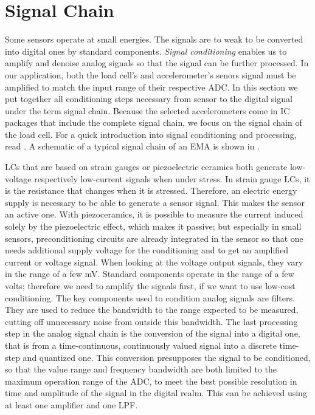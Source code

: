 \chapter{Signal Chain%
  \label{chap:\currfilebase}}

  Some sensors operate at small energies. The signals are to weak to be converted into digital ones by standard components. \emph{Signal conditioning} enables us to amplify and denoise analog signals so that the signal can be further processed. In our application, both the load cell's and accelerometer's senors signal must be amplified to match the input range of their respective \ac{ADC}. In this section we put together all conditioning steps necessary from sensor to the digital signal under the term signal chain. Because the selected accelerometers come in \ac{IC} packages that include the complete signal chain, we focus on the signal chain of the load cell. For a quick introduction into signal conditioning and processing, read . A schematic of a typical signal chain of an \ac{EMA} is shown in .

\ac{LC}s that are based on strain gauges or piezoelectric ceramics both generate low-voltage respectively low-current signals when under stress. In strain gauge \ac{LC}s, it is the resistance that changes when it is stressed. Therefore, an electric energy supply is necessary to be able to generate a sensor signal. This makes the sensor an active one. With piezoceramics, it is possible to measure the current induced solely by the piezoelectric effect, which makes it passive; but especially in small sensors, preconditioning circuits are already integrated in the sensor so that one needs additional supply voltage for the conditioning and to get an amplified current or voltage signal. When looking at the voltage output signals, they vary in the range of a few \si{\milli\volt}. Standard components operate in the range of a few volts; therefore we need to amplify the signals first, if we want to use low-cost conditioning. The key components used to condition analog signals are filters. They are used to reduce the bandwidth to the range expected to be measured, cutting off unnecessary noise from outside this bandwidth. The last processing step in the analog signal chain is the conversion of the signal into a digital one, that is from a time-continuous, continuously valued signal into a discrete time-step and quantized one. This conversion presupposes the signal to be conditioned, so that the value range and frequency bandwidth are both limited to the maximum operation range of the \ac{ADC}, to meet the best possible resolution in time and amplitude of the signal in the digital realm. This can be achieved using at least one amplifier and one \ac{LPF}.

